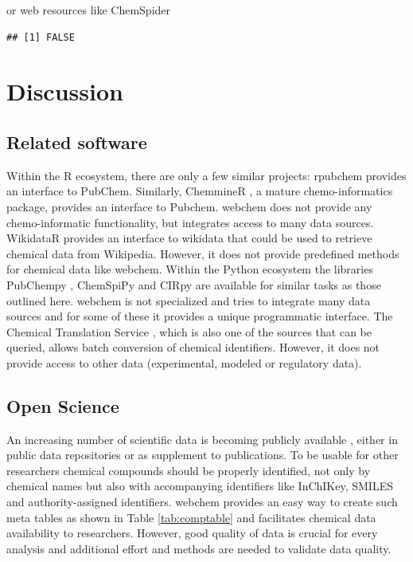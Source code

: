 or web resources like ChemSpider
\begin{knitrout}
\color{fgcolor}\begin{kframe}
\begin{alltt}
\hlstd{(}\hlstd{,}
   \hlstd{=} \hlstd{)}
\end{alltt}
\begin{verbatim}
## [1] FALSE
\end{verbatim}
\end{kframe}
\end{knitrout}

\section[Discussion]{Discussion}
\subsection[Related software]{Related software}
Within the R ecosystem, there are only a few similar projects:
rpubchem \citep{rpubchem_2014} provides an interface to PubChem.
Similarly, ChemmineR \citep{chemminer_2008}, a mature chemo-informatics package, provides an interface to Pubchem. 
webchem does not provide any chemo-informatic functionality, but integrates access to many data sources.
WikidataR \citep{wikidatar_2016} provides an interface to wikidata that could be used to retrieve chemical data from Wikipedia.
However, it does not provide predefined methods for chemical data like webchem.
Within the Python ecosystem the libraries PubChempy \citep{pubchempy}, ChemSpiPy \citep{chemspipy} and CIRpy \citep{cirpy} are available for similar tasks as those outlined here.
webchem is not specialized and tries to integrate many data sources and for some of these it provides a unique programmatic interface.
The Chemical Translation Service \citep{wohlgemuth_haldiya_willighagen_kind_fiehn_2010}, which is also one of the sources that can be queried, allows batch conversion of chemical identifiers.
However, it does not provide access to other data (experimental, modeled or regulatory data).


\subsection[Open Science]{Open Science}
An increasing number of scientific data is becoming publicly available \citep{Gewin_2016, Reichman_Jones_Schildhauer_2011,Boyle_Guha_2011}, either in public data repositories or as supplement to publications.
To be usable for other researchers chemical compounds should be properly identified, not only by chemical names but also with accompanying identifiers like InChIKey, SMILES and authority-assigned identifiers.
webchem provides an easy way to create such meta tables as shown in Table \ref{tab:comptable} and facilitates chemical data availability to researchers.
However, good quality of data is crucial for every analysis \citep{stieger2014} and additional effort and methods are needed to validate data quality.

